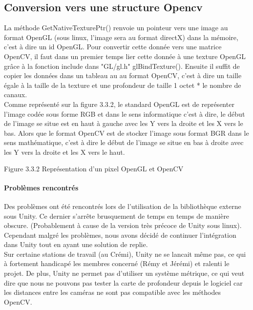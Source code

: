 \documentclass[12pt,a4paper]{report}
\begin{document}
\subsection{Conversion vers une structure Opencv}
La méthode GetNativeTexturePtr() renvoie un pointeur vers une image au format OpenGL (sous linux, l'image sera au format directX) dans la mémoire, c'est à dire un id OpenGL. Pour convertir cette donnée vers une matrice OpenCV, il faut dans un premier temps lier cette donnée à une texture OpenGL grâce à la fonction include dans "GL/gl.h" glBindTexture(). Ensuite il suffit de copier les données dans un tableau au au format OpenCV, c'est à dire un taille égale à la taille de la texture et une profondeur de taille 1 octet * le nombre de canaux.\\
Comme représenté sur la figure 3.3.2, le standard OpenGL est de représenter l'image codée sous forme RGB et dans le sens informatique c'est à dire, le début de l'image se situe est en haut à gauche avec les Y vers la droite et les X vers le bas. Alors que le format OpenCV est de stocker l'image sous format BGR dans le sens mathématique, c'est à dire le début de l'image se situe en bas à droite avec les Y vers la droite et les X vers le haut.\\

\begin{center}

Figure 3.3.2 Représentation d'un pixel OpenGL et OpenCV
\end{center}

\paragraph{Problèmes rencontrés}
Des problèmes ont été rencontrés lors de l'utilisation de la bibliothèque externe sous Unity. Ce dernier s'arrête brusquement de temps en temps de manière obscure. (Probablement à cause de la version très précoce de Unity sous linux). Cependant malgré les problèmes, nous avons décidé de continuer l'intégration dans Unity tout en ayant une solution de replie.\\
Sur certaine stations de travail (au Crémi), Unity ne se lancait même pas, ce qui à fortement handicapé les membres concerné (Rémy et Jérémi) et ralenti le projet. De plus, Unity ne permet pas d'utiliser un système métrique, ce qui veut dire que nous ne pouvons pas tester la carte de profondeur depuis le logiciel car les distances entre les caméras ne sont pas compatible avec les méthodes OpenCV.
\end{document}
